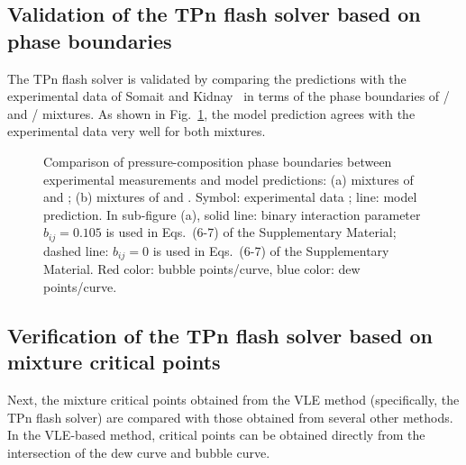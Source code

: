     \subsection{Validation of the TPn flash solver based on phase boundaries}
    The TPn flash solver is validated by comparing the predictions with the experimental data of Somait and Kidnay~\cite{somait1978liquid} in terms of the phase boundaries of / and / mixtures. As shown in Fig.~\ref{v1}, the model prediction agrees with the experimental data very well for both mixtures.
    \begin{figure}[htbp]
        \centering
        \caption{Comparison of pressure-composition phase boundaries between experimental measurements and model predictions: (a) mixtures of  and ; (b) mixtures of  and . Symbol: experimental data \citep{somait1978liquid}; line: model prediction. In sub-figure (a), solid line: binary interaction parameter $b_{ij}=0.105$ is used in Eqs.~(6-7) of the Supplementary Material; dashed line: $b_{ij}=0$ is used in Eqs.~(6-7) of the Supplementary Material. Red color: bubble points/curve, blue color: dew points/curve.}
        \label{v1}
    \end{figure}

    \subsection{Verification of the TPn flash solver based on mixture critical points}
    Next, the mixture critical points obtained from the VLE method (specifically, the TPn flash solver) are compared with those obtained from several other methods. In the VLE-based method, critical points can be obtained directly from the intersection of the dew curve and bubble curve.

